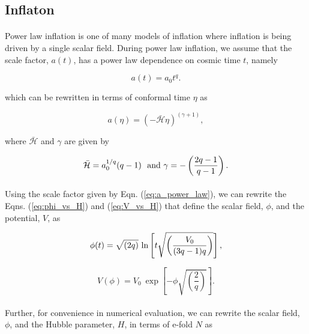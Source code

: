 \documentclass[12pt,a4paper,oneside]{book}
\begin{document}
\subsection{Inflaton}

\paragraph*{} Power law inflation is one of many models of inflation where
inflation is being driven by a single scalar field. During power law inflation, 
we assume that the scale factor, $a(t)$, has a power law dependence on 
cosmic time $t$, namely 

\begin{equation}\label{eq:a_power_law}
a(t) = a_0t^q.
\end{equation}

\noindent which can be rewritten in terms 
of conformal time $\eta$ as 

\begin{equation}
a(\eta) = \left(-\mathcal{\bar{H}}\eta\right)^{\left(\gamma+1\right)},
\end{equation}

\noindent where $\mathcal{\bar{H}}$ and $\gamma$ are given by 

\begin{equation}
\mathcal{\bar{H}} = a_0^{1/q}(q-1) ~{\rm ~and}~ \gamma  = -\left(\frac{2q-1}{q-1}\right).
\end{equation}

\paragraph*{} Using the scale factor given by Eqn. (\ref{eq:a_power_law}), 
we can rewrite the Eqns. (\ref{eq:phi_vs_H}) and (\ref{eq:V_vs_H}) that define 
the scalar field, $\phi$, and the potential, $V$, as

\begin{equation}
\phi(t) =\sqrt{\left(2q\right)} ~{\rm ln}\left[t\sqrt
{\left(\frac{V_0}{(3q-1)q}\right)}\right],
\end{equation}

\begin{equation}
V(\phi) = V_0~\exp\left[-\phi\sqrt{\left(\frac{2}{q}\right)}\right].
\end{equation}

\paragraph*{} Further, for convenience in numerical evaluation, we can rewrite 
the scalar field, $\phi$, and the Hubble parameter, $H$, in terms of e-fold $N$ as 
\end{document}
